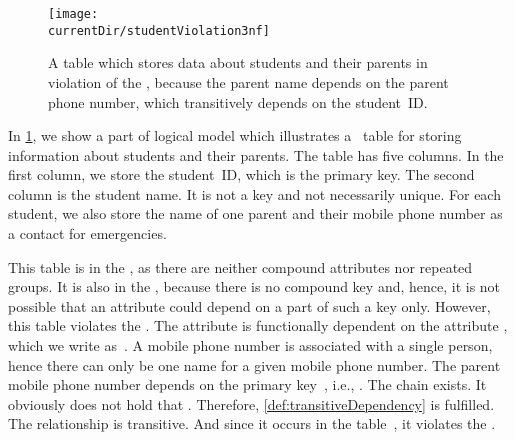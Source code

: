 %
\FloatBarrier%
%
\begin{figure}%
\centering%
%
\texttt{[image: \\currentDir/studentViolation3nf]}%
%
\caption{A table which stores data about students and their parents in violation of the , because the parent name depends on the parent phone number, which transitively depends on the student~ID.}%
\label{fig:studentViolation3nf}%
\end{figure}%
%
%
%
%
%
%
%
%
%
%
%
%
In \cref{fig:studentViolation3nf}, we show a part of logical model which illustrates a \db\ table for storing information about students and their parents.
The table has five columns.
In the first column, we store the student~ID, which is the primary key.
The second column is the student name.
It is not a key and not necessarily unique.
For each student, we also store the name of one parent and their mobile phone number as a contact for emergencies.

This table is in the , as there are neither compound attributes nor repeated groups.
It is also in the , because there is no compound key and, hence, it is not possible that an attribute could depend on a part of such a key only.
However, this table violates the .
The attribute  is functionally dependent on the attribute , which we write as~.
A mobile phone number is associated with a single person, hence there can only be one name for a given mobile phone number.
The parent mobile phone number depends on the primary key~, i.e., .
The chain  exists.
It obviously does not hold that .
Therefore, \cref{def:transitiveDependency} is fulfilled.
The relationship  is transitive.
And since it occurs in the table~, it violates the .

